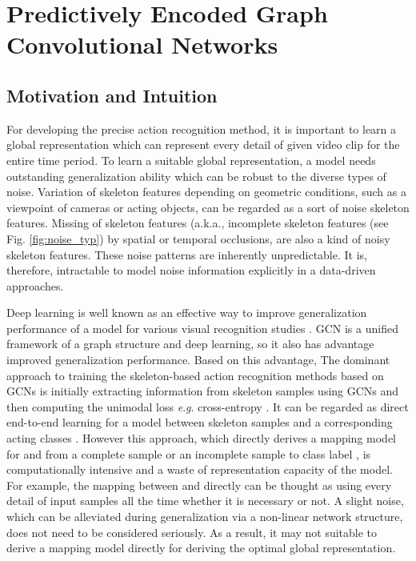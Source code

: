\documentclass[runningheads]{llncs}
\newcommand{\eg}{\textit{e}.\textit{g}. }
\begin{document}
\section{Predictively Encoded Graph Convolutional Networks}
\label{sec:3}
\subsection{Motivation and Intuition}
For developing the precise action recognition method, it is important to learn a global representation which can represent every detail of given video clip for the entire time period. To learn a suitable global representation, a model needs outstanding generalization ability which can be robust to the diverse types of noise. Variation of skeleton features depending on geometric conditions, such as a viewpoint of cameras or acting objects, can be regarded as a sort of noise skeleton features. Missing of skeleton features (a.k.a., incomplete skeleton features \cite{song2019richly} (see Fig. \ref{fig:noise_typ}) by spatial or temporal occlusions, are also a kind of noisy skeleton features. These noise patterns are inherently unpredictable. It is, therefore, intractable to model noise information explicitly in a data-driven approaches.

Deep learning is well known as an effective way to improve generalization performance of a model for various visual recognition studies \cite{krizhevsky2012imagenet,du2015hierarchical,badrinarayanan2017segnet,girshick2015fast}. GCN is a unified framework of a graph structure and deep learning, so it also has advantage improved generalization performance. Based on this advantage, The dominant approach to training the skeleton-based action recognition methods based on GCNs is initially extracting information from skeleton samples using GCNs and then computing the unimodal loss \eg cross-entropy \cite{yan2018spatial,shi2019two,shi2019skeleton,song2019richly,li2019actional,si2019attention}. It can be regarded as direct end-to-end learning for a model  between skeleton samples  and a corresponding acting classes . However this approach, which directly derives a mapping model for  and  from a complete sample  or an incomplete sample  to class label , is computationally intensive and a waste of representation capacity of the model. For example, the mapping between  and  directly can be thought as using every detail of input samples all the time whether it is necessary or not. A slight noise, which can be alleviated during generalization via a non-linear network structure, does not need to be considered seriously. As a result, it may not suitable to derive a mapping model  directly for deriving the optimal global representation.
\end{document}
